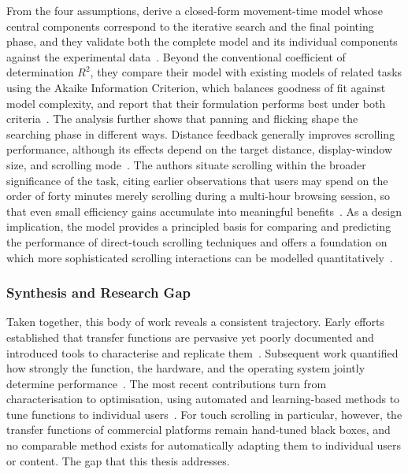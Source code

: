 \documentclass[12pt,a4paper]{report}
\begin{document}
        From the four assumptions, \citeauthor{zhao2014model} derive a closed-form movement-time model whose central components correspond to the iterative search and the final pointing phase, and they validate both the complete model and its individual components against the experimental data~\cite{zhao2014model}. Beyond the conventional coefficient of determination $R^2$, they compare their model with existing models of related tasks using the Akaike Information Criterion, which balances goodness of fit against model complexity, and report that their formulation performs best under both criteria~\cite{zhao2014model}. The analysis further shows that panning and flicking shape the searching phase in different ways. Distance feedback generally improves scrolling performance, although its effects depend on the target distance, display-window size, and scrolling mode~\cite{zhao2014model}. The authors situate scrolling within the broader significance of the task, citing earlier observations that users may spend on the order of forty minutes merely scrolling during a multi-hour browsing session, so that even small efficiency gains accumulate into meaningful benefits~\cite{zhao2014model}. As a design implication, the model provides a principled basis for comparing and predicting the performance of direct-touch scrolling techniques and offers a foundation on which more sophisticated scrolling interactions can be modelled quantitatively~\cite{zhao2014model}.

        \subsubsection{Synthesis and Research Gap}

        Taken together, this body of work reveals a consistent trajectory. Early efforts established that transfer functions are pervasive yet poorly documented and introduced tools to characterise and replicate them~\cite{casiez2011no, quinn2012exposing, quinn2013touch}. Subsequent work quantified how strongly the function, the hardware, and the operating system jointly determine performance~\cite{hanada2021relevance, an2025libpad, kim2025hardware}. The most recent contributions turn from characterisation to optimisation, using automated and learning-based methods to tune functions to individual users~\cite{lee2020autogain, eddy2026tftune}. For touch scrolling in particular, however, the transfer functions of commercial platforms remain hand-tuned black boxes, and no comparable method exists for automatically adapting them to individual users or content. The gap that this thesis addresses.
\end{document}

